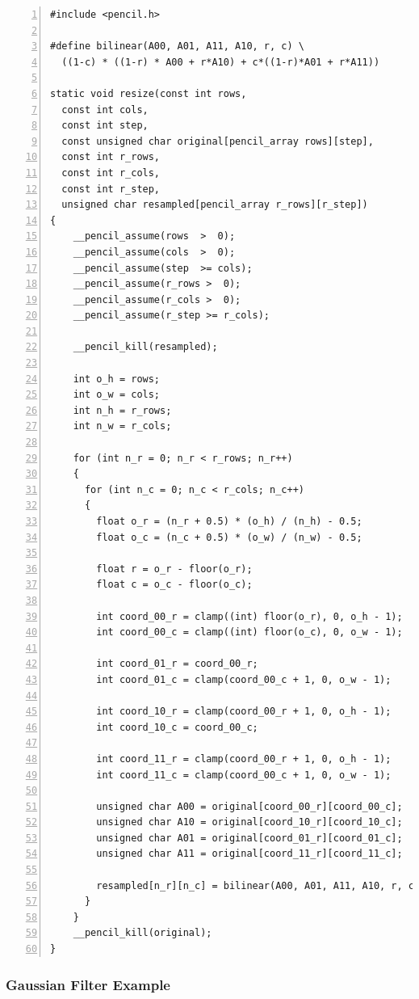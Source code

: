 \begin{lstlisting}[language=pencil,escapechar=@, numbers=left,numberstyle={\tiny\tt},numbersep=5pt]
#include <pencil.h>

#define bilinear(A00, A01, A11, A10, r, c) \
  ((1-c) * ((1-r) * A00 + r*A10) + c*((1-r)*A01 + r*A11))

static void resize(const int rows,
  const int cols,
  const int step,
  const unsigned char original[pencil_array rows][step],
  const int r_rows,
  const int r_cols,
  const int r_step,
  unsigned char resampled[pencil_array r_rows][r_step])
{
    __pencil_assume(rows  >  0);
    __pencil_assume(cols  >  0);
    __pencil_assume(step  >= cols);
    __pencil_assume(r_rows >  0);
    __pencil_assume(r_cols >  0);
    __pencil_assume(r_step >= r_cols);

    __pencil_kill(resampled);

    int o_h = rows;
    int o_w = cols;
    int n_h = r_rows;
    int n_w = r_cols;

    for (int n_r = 0; n_r < r_rows; n_r++)
    {
      for (int n_c = 0; n_c < r_cols; n_c++)
      {
        float o_r = (n_r + 0.5) * (o_h) / (n_h) - 0.5;
        float o_c = (n_c + 0.5) * (o_w) / (n_w) - 0.5;

        float r = o_r - floor(o_r);
        float c = o_c - floor(o_c);

        int coord_00_r = clamp((int) floor(o_r), 0, o_h - 1);
        int coord_00_c = clamp((int) floor(o_c), 0, o_w - 1);

        int coord_01_r = coord_00_r;
        int coord_01_c = clamp(coord_00_c + 1, 0, o_w - 1);

        int coord_10_r = clamp(coord_00_r + 1, 0, o_h - 1);
        int coord_10_c = coord_00_c;

        int coord_11_r = clamp(coord_00_r + 1, 0, o_h - 1);
        int coord_11_c = clamp(coord_00_c + 1, 0, o_w - 1);

        unsigned char A00 = original[coord_00_r][coord_00_c];
        unsigned char A10 = original[coord_10_r][coord_10_c];
        unsigned char A01 = original[coord_01_r][coord_01_c];
        unsigned char A11 = original[coord_11_r][coord_11_c];

        resampled[n_r][n_c] = bilinear(A00, A01, A11, A10, r, c);
      }
    }
    __pencil_kill(original);
}
\end{lstlisting}


\subsubsection{Gaussian Filter Example}

